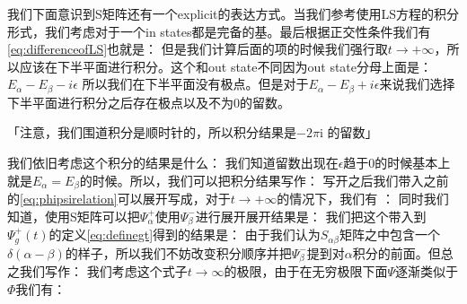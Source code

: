 我们下面意识到S矩阵还有一个explicit的表达方式。当我们参考使用LS方程的积分形式，我们考虑对于一个in states都是完备的基。最后根据正交性条件我们有\cref{eq:differenceofLS}也就是：
但是我们计算后面的项的时候我们强行取$ t \to +\infty $，所以应该在下半平面进行积分。这个和out state不同因为out state分母上面是：$ E_\alpha-E_\beta- i\epsilon $ 所以我们在下半平面没有极点。但是对于$ E_\alpha-E_\beta+ i\epsilon $来说我们选择下半平面进行积分之后存在极点以及不为0的留数。

「注意，我们围道积分是顺时针的，所以积分结果是$ -2 \pi \mathrm{i} $ 的留数」

我们依旧考虑这个积分的结果是什么：
我们知道留数出现在$ \epsilon $趋于0的时候基本上就是$ E_\alpha = E_\beta $的时候。所以，我们可以把积分结果写作：
写开之后我们带入之前的\cref{eq:phipsirelation}可以展开写成，对于$ t \to +\infty $的情况下，我们有 ：
\line
同时我们知道，使用S矩阵可以把$ \Psi_\alpha^{+} $使用$ \Psi_\beta^{-} $进行展开展开结果是：
我们把这个带入到$ \Psi_g^+(t) $的定义\cref{eq:definegt}得到的结果是：
由于我们认为$ S_{\alpha\beta} $矩阵之中包含一个$ \delta(\alpha - \beta) $的样子，所以我们不妨改变积分顺序并把$ \Psi_\beta^- $提到对$ \alpha $积分的前面。但总之我们写作：
我们考虑这个式子$ t \to \infty $的极限，由于在无穷极限下面$ \Psi $逐渐类似于$ \Phi $我们有：

